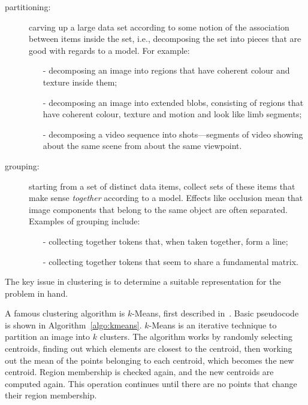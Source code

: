 \begin{description}
\item[partitioning:] carving up a large data set according to some notion of the association between items inside the set, i.e., decomposing the set into pieces that are good with regards to a model. For example:
	\begin{itemize}
	\item[-] decomposing an image into regions that have coherent colour and texture inside them;
	
	\item[-] decomposing an image into extended blobs, consisting of regions that have coherent colour, texture and motion and look like limb segments;
	
	\item[-] decomposing a video sequence into shots---segments of video showing about the same scene from about the same viewpoint.
	\end{itemize}

\item[grouping:] starting from a set of distinct data items, collect sets of these items that make sense \emph{together} according to a model. Effects like occlusion mean that image components that belong to the same object are often separated. Examples of grouping include:
	\begin{itemize}
	\item[-] collecting together tokens that, when taken together, form a line;
	
	\item[-] collecting together tokens that seem to share a fundamental matrix.
	\end{itemize}
\end{description}

The key issue in clustering is to determine a suitable representation for the problem in hand.

\label{kmeans}
A famous clustering algorithm is $k$-Means, first described in~\cite{macqueen:1967}. Basic pseudocode is shown in Algorithm~\ref{algo:kmeans}. $k$-Means is an iterative technique to partition an image into $k$ clusters. The algorithm works by randomly selecting centroids, finding out which elements are closest to the centroid, then working out the mean of the points belonging to each centroid, which becomes the new centroid. Region membership is checked again, and the new centroids are computed again. This operation continues until there are no points that change their region membership.

